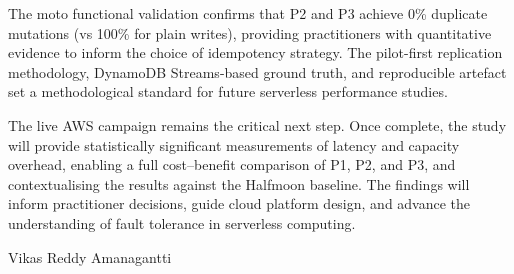 The moto functional validation confirms that P2 and P3 achieve 0\% duplicate mutations (vs 100\% for plain writes), providing practitioners with quantitative evidence to inform the choice of idempotency strategy. The pilot-first replication methodology, DynamoDB Streams-based ground truth, and reproducible artefact set a methodological standard for future serverless performance studies.

The live AWS campaign remains the critical next step. Once complete, the study will provide statistically significant measurements of latency and capacity overhead, enabling a full cost--benefit comparison of P1, P2, and P3, and contextualising the results against the Halfmoon baseline. The findings will inform practitioner decisions, guide cloud platform design, and advance the understanding of fault tolerance in serverless computing.

Vikas Reddy Amanagantti
